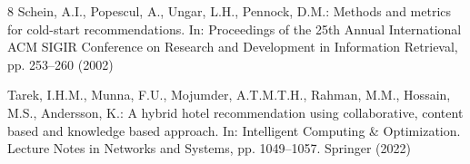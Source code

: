 \documentclass[runningheads]{llncs}
\begin{document}
\begin{thebibliography}{8}
Schein, A.I., Popescul, A., Ungar, L.H., Pennock, D.M.: Methods and metrics for cold-start recommendations. In: Proceedings of the 25th Annual International ACM SIGIR Conference on Research and Development in Information Retrieval, pp. 253--260 (2002)

Tarek, I.H.M., Munna, F.U., Mojumder, A.T.M.T.H., Rahman, M.M., Hossain, M.S., Andersson, K.: A hybrid hotel recommendation using collaborative, content based and knowledge based approach. In: Intelligent Computing \& Optimization. Lecture Notes in Networks and Systems, pp. 1049--1057. Springer (2022)

\end{thebibliography}
\end{document}
